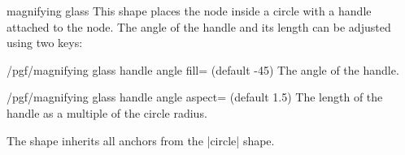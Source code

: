 \begin{shape}{magnifying glass}
    This shape places the node inside a circle with a handle attached to the
    node. The angle of the handle and its length can be adjusted using two
    keys:

    \begin{key}{/pgf/magnifying glass handle angle fill= (default -45)}
        The angle of the handle.
    \end{key}

    \begin{key}{/pgf/magnifying glass handle angle aspect= (default 1.5)}
        The length of the handle as a multiple of the circle radius.
    \end{key}
\begin{codeexample}[preamble={\usetikzlibrary{shapes.symbols}}]
\end{codeexample}
    The shape inherits all anchors from the |circle| shape.
\end{shape}

